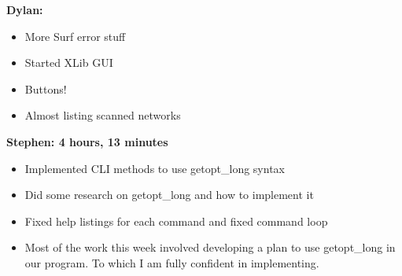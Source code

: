\documentclass[11pt]{article}
\begin{document}
\textbf{Dylan:}
\begin{itemize}
  \item More Surf error stuff
  \item Started XLib GUI
  \item Buttons!
  \item Almost listing scanned networks
\end{itemize}

\textbf{Stephen: 4 hours, 13 minutes}
\begin{itemize}
  \item Implemented CLI methods to use getopt_long syntax
  \item Did some research on getopt_long and how to implement it
  \item Fixed help listings for each command and fixed command loop 
  \item Most of the work this week involved developing a plan to use 
	getopt_long in our program. To which I am fully confident in 
	implementing. 
\end{itemize}
\end{document}

